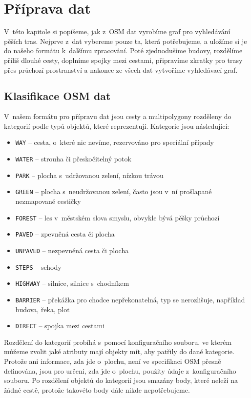 \chapter{Příprava dat}
V~této kapitole si popíšeme, jak z~OSM dat vyrobíme graf pro vyhledávání pěších
tras. Nejprve z~dat vybereme pouze ta, která potřebujeme, a uložíme si je do
našeho formátu k~dalšímu zpracování. Poté zjednodušíme budovy, rozdělíme příliš
dlouhé cesty, doplníme spojky mezi cestami, připravíme zkratky pro trasy přes
průchozí prostranství a nakonec ze všech dat vytvoříme vyhledávací graf.

\section{Klasifikace OSM dat}
V~našem formátu pro přípravu dat jsou cesty a multipolygony rozděleny do
kategorií podle typů objektů, které reprezentují. Kategorie jsou
následující:
\begin{itemize}
	\item \verb|WAY| -- cesta, o~které nic nevíme, rezervováno pro speciální
	případy
	\item \verb|WATER| -- strouha či přeskočitelný potok
	\item \verb|PARK| -- plocha s~udržovanou zelení, nízkou trávou
	\item \verb|GREEN| -- plocha s~neudržovanou zelení, často jsou v~ní
	prošlapané nezmapované cestičky
	\item \verb|FOREST| -- les v~městském slova smyslu, obvykle bývá pěšky
	průchozí
	\item \verb|PAVED| -- zpevněná cesta či plocha
	\item \verb|UNPAVED| -- nezpevněná cesta či plocha
	\item \verb|STEPS| -- schody
	\item \verb|HIGHWAY| -- silnice, silnice s~chodníkem
	\item \verb|BARRIER| -- překážka pro chodce nepřekonatelná, typ se
	nerozlišuje, například budova, řeka, plot
	\item \verb|DIRECT| -- spojka mezi cestami
\end{itemize}
Rozdělení do kategorií probíhá s~pomocí konfiguračního souboru, ve kterém můžeme
zvolit jaké atributy mají objekty mít, aby patřily do dané kategorie. Protože
ani informace, zda jde o~plochu, není ve specifikaci OSM přesně definována, jsou
pro určení, zda jde o~plochu, použity údaje z~konfiguračního souboru. Po
rozdělení objektů do kategorií jsou smazány body, které neleží na žádné cestě,
protože takovéto body dále nikde nepotřebujeme.

